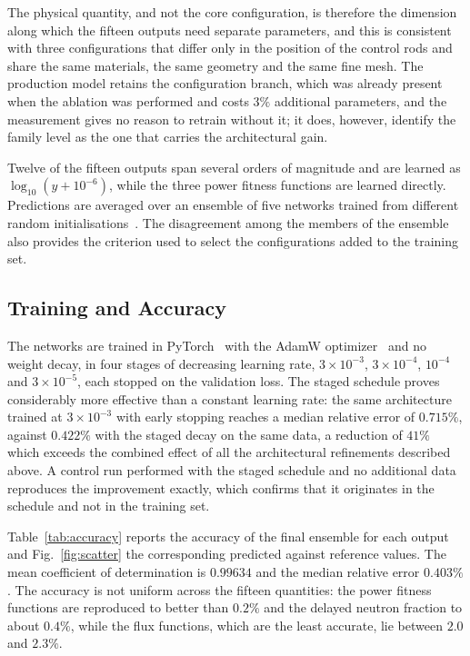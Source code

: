 \documentclass{style/nseJournal}
\begin{document}
The physical quantity, and not the core configuration, is therefore the
dimension along which the fifteen outputs need separate parameters, and this is
consistent with three configurations that differ only in the position of the
control rods and share the same materials, the same geometry and the same fine
mesh. The production model retains the configuration branch, which was already
present when the ablation was performed and costs $3\%$ additional parameters,
and the measurement gives no reason to retrain without it; it does, however,
identify the family level as the one that carries the architectural gain.



Twelve of the fifteen outputs span several orders of magnitude and are learned
as $\log_{10}(y+10^{-6})$, while the three power fitness functions are learned
directly. Predictions are averaged over an ensemble of five networks trained
from different random initialisations~\cite{deepEnsembles}. The disagreement
among the members of the ensemble also provides the criterion used to select the
configurations added to the training set.

\subsection{Training and Accuracy}

The networks are trained in PyTorch~\cite{pytorch} with the AdamW
optimizer~\cite{adamw} and no weight decay, in four stages of decreasing
learning rate, $3\times10^{-3}$, $3\times10^{-4}$, $10^{-4}$ and
$3\times10^{-5}$, each stopped on the validation loss. The staged schedule
proves considerably more effective than a constant learning rate: the same
architecture trained at $3\times10^{-3}$ with early stopping reaches a median
relative error of $0.715\%$, against $0.422\%$ with the staged decay on the same
data, a reduction of $41\%$ which exceeds the combined effect of all the
architectural refinements described above. A control run performed with the
staged schedule and no additional data reproduces the improvement exactly, which
confirms that it originates in the schedule and not in the training set.

Table~\ref{tab:accuracy} reports the accuracy of the final ensemble for each
output and Fig.~\ref{fig:scatter} the corresponding predicted against reference
values. The mean coefficient of determination is $0.99634$ and the median
relative error $0.403\%$. The accuracy is not uniform across the fifteen
quantities: the power fitness functions are reproduced to better than $0.2\%$
and the delayed neutron fraction to about $0.4\%$, while the flux functions,
which are the least accurate, lie between $2.0$ and $2.3\%$.
\end{document}
